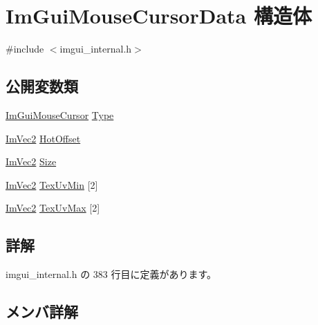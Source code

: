 \hypertarget{struct_im_gui_mouse_cursor_data}{}\section{Im\+Gui\+Mouse\+Cursor\+Data 構造体}
\label{struct_im_gui_mouse_cursor_data}


{\ttfamily \#include $<$imgui\+\_\+internal.\+h$>$}

\subsection*{公開変数類}
\begin{DoxyCompactItemize}
\item 
\mbox{\hyperlink{imgui_8h_a9223d6c82bb5d12c2eab5f829ca520ef}{Im\+Gui\+Mouse\+Cursor}} \mbox{\hyperlink{struct_im_gui_mouse_cursor_data_ab58df812a8caf8741415053515b8f347}{Type}}
\item 
\mbox{\hyperlink{struct_im_vec2}{Im\+Vec2}} \mbox{\hyperlink{struct_im_gui_mouse_cursor_data_ae271e8ec495657c2231d6e47540d3b36}{Hot\+Offset}}
\item 
\mbox{\hyperlink{struct_im_vec2}{Im\+Vec2}} \mbox{\hyperlink{struct_im_gui_mouse_cursor_data_af8dd3ec3de77811d6caf4bfdde085495}{Size}}
\item 
\mbox{\hyperlink{struct_im_vec2}{Im\+Vec2}} \mbox{\hyperlink{struct_im_gui_mouse_cursor_data_add35adb991fcfd03ae33c3607aa0c842}{Tex\+Uv\+Min}} \mbox{[}2\mbox{]}
\item 
\mbox{\hyperlink{struct_im_vec2}{Im\+Vec2}} \mbox{\hyperlink{struct_im_gui_mouse_cursor_data_a30bae90a9e61608c4fd9fe03b5f7390f}{Tex\+Uv\+Max}} \mbox{[}2\mbox{]}
\end{DoxyCompactItemize}


\subsection{詳解}


 imgui\+\_\+internal.\+h の 383 行目に定義があります。



\subsection{メンバ詳解}
\mbox{\label{struct_im_gui_mouse_cursor_data_ae271e8ec495657c2231d6e47540d3b36}} 
